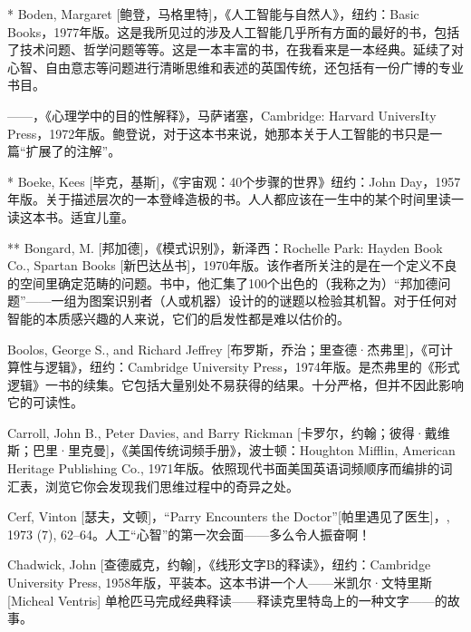 \begin{thebib}
\begin{biblist}
\item[*] Boden, Margaret [鲍登，马格里特]，《人工智能与自然人》，纽约：Basic Books，1977年版。这是我所见过的涉及人工智能几乎所有方面的最好的书，包括了技术问题、哲学问题等等。这是一本丰富的书，在我看来是一本经典。延续了对心智、自由意志等问题进行清晰思维和表述的英国传统，还包括有一份广博的专业书目。

\item ——，《心理学中的目的性解释》，马萨诸塞，Cambridge: Harvard UniversIty Press，1972年版。鲍登说，对于这本书来说，她那本关于人工智能的书只是一篇“扩展了的注解”。

\item[*] Boeke, Kees [毕克，基斯]，《宇宙观：40个步骤的世界》纽约：John Day，1957年版。关于描述层次的一本登峰造极的书。人人都应该在一生中的某个时间里读一读这本书。适宜儿童。

\item[**] Bongard, M. [邦加德]，《模式识别》，新泽西：Rochelle Park: Hayden Book Co., Spartan Books [新巴达丛书]，1970年版。该作者所关注的是在一个定义不良的空间里确定范畴的问题。书中，他汇集了100个出色的（我称之为）“邦加德问题”——一组为图案识别者（人或机器）设计的的谜题以检验其机智。对于任何对智能的本质感兴趣的人来说，它们的启发性都是难以估价的。

\item Boolos, George S., and Richard Jeffrey [布罗斯，乔治；里查德·杰弗里]，《可计算性与逻辑》，纽约：Cambridge University Press，1974年版。是杰弗里的《形式逻辑》一书的续集。它包括大量别处不易获得的结果。十分严格，但并不因此影响它的可读性。

\item Carroll, John B., Peter Davies, and Barry Rickman [卡罗尔，约翰；彼得·戴维斯；巴里·里克曼]，《美国传统词频手册》，波士顿：Houghton Mifflin, American Heritage Publishing Co., 1971年版。依照现代书面美国英语词频顺序而编排的词汇表，浏览它你会发现我们思维过程中的奇异之处。

\item Cerf, Vinton [瑟夫，文顿]，“Parry Encounters the Doctor”[帕里遇见了医生]，, 1973 (7), 62--64。人工“心智”的第一次会面——多么令人振奋啊！

\item Chadwick, John [查德威克，约翰]，《线形文字B的释读》，纽约：Cambridge University Press, 1958年版，平装本。这本书讲一个人——米凯尔·文特里斯 [Micheal Ventris] 单枪匹马完成经典释读——释读克里特岛上的一种文字——的故事。


\end{biblist}
\end{thebib}
